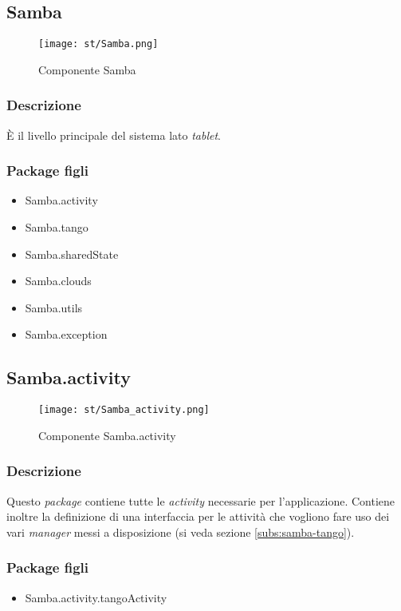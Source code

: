 \subsection{Samba}
\begin{figure}[H] 
    \centering 
    \texttt{[image: st/Samba.png]} 
    \caption{Componente Samba}\label{fig:comp-Samba}
\end{figure}
\subsubsection{Descrizione}
È il livello principale del sistema lato \emph{tablet}.
\subsubsection{Package figli}
\begin{itemize}
	\item Samba.activity
	\item Samba.tango
	\item Samba.sharedState
	\item Samba.clouds
	\item Samba.utils
	\item Samba.exception
\end{itemize}

\subsection{Samba.activity}
\begin{figure}[H] 
    \centering 
    \texttt{[image: st/Samba\_activity.png]} 
    \caption{Componente Samba.activity}
\end{figure}
\subsubsection{Descrizione}
Questo \emph{package} contiene tutte le \emph{activity} necessarie per l'applicazione. Contiene inoltre la definizione di una interfaccia per le attività che vogliono fare uso dei vari \emph{manager} messi a disposizione (si veda sezione \ref{subs:samba-tango}).
\subsubsection{Package figli}
\begin{itemize}
	\item Samba.activity.tangoActivity
\end{itemize}
